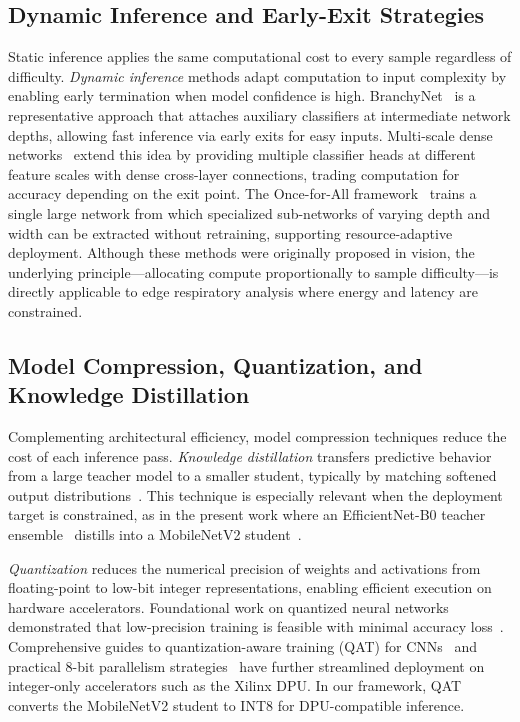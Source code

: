 \subsection{Dynamic Inference and Early-Exit Strategies}
Static inference applies the same computational cost to every sample regardless of difficulty. \emph{Dynamic inference} methods adapt computation to input complexity by enabling early termination when model confidence is high. BranchyNet~\cite{branchynet} is a representative approach that attaches auxiliary classifiers at intermediate network depths, allowing fast inference via early exits for easy inputs. Multi-scale dense networks~\cite{msdnet2018} extend this idea by providing multiple classifier heads at different feature scales with dense cross-layer connections, trading computation for accuracy depending on the exit point. The Once-for-All framework~\cite{ofa2020} trains a single large network from which specialized sub-networks of varying depth and width can be extracted without retraining, supporting resource-adaptive deployment. Although these methods were originally proposed in vision, the underlying principle---allocating compute proportionally to sample difficulty---is directly applicable to edge respiratory analysis where energy and latency are constrained.

\subsection{Model Compression, Quantization, and Knowledge Distillation}
Complementing architectural efficiency, model compression techniques reduce the cost of each inference pass. \emph{Knowledge distillation} transfers predictive behavior from a large teacher model to a smaller student, typically by matching softened output distributions~\cite{hinton2015distilling}. This technique is especially relevant when the deployment target is constrained, as in the present work where an EfficientNet-B0 teacher ensemble~\cite{efficientnet2019} distills into a MobileNetV2 student~\cite{b35}.

\emph{Quantization} reduces the numerical precision of weights and activations from floating-point to low-bit integer representations, enabling efficient execution on hardware accelerators. Foundational work on quantized neural networks demonstrated that low-precision training is feasible with minimal accuracy loss~\cite{hubara2016qnn,jacob2017quantization}. Comprehensive guides to quantization-aware training (QAT) for CNNs~\cite{krishnamoorthi2018quant} and practical 8-bit parallelism strategies~\cite{dettmers2015} have further streamlined deployment on integer-only accelerators such as the Xilinx DPU. In our framework, QAT converts the MobileNetV2 student to INT8 for DPU-compatible inference.

